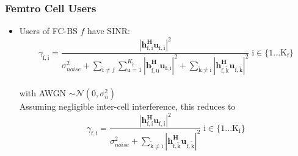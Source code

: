 \documentclass[12pt]{article}
\begin{document}
\subsubsection{Femtro Cell Users}
\begin{itemize}



\item Users of FC-BS $f$ have SINR:
\begin{equation}
\gamma_{\mathrm{f,i}} = \frac{|\mathbf{h^H_{\mathrm{f,i}}u_{\mathrm{f,i}}}|^2}
{\sigma^2_{noise}   + \sum_{\mathrm{\tilde{f}}\neq f} \sum_{\mathrm{u=1}}^{K_{\mathrm{\tilde{f}}}}
|\mathbf{h^H_{\mathrm{\tilde{f},u}}u_{\mathrm{f,i}}}|^2
 + \sum_{\mathrm{\tilde{k}\neq i}}
  |\mathbf{h^H_{\mathrm{f,\tilde{k}}}u_{\mathrm{f,\tilde{k}}}}|^2}
  \; \mathrm{i \in \{1 ... K_f\}}
\end{equation}
\\
with AWGN $\sim \mathcal{N}(0,\sigma^2_n)$
\\

Assuming negligible inter-cell interference, this reduces to
\begin{equation}
\gamma_{\mathrm{f,i}} = \frac{|\mathbf{h^H_{\mathrm{f,i}}u_{\mathrm{f,i}}}|^2}
{\sigma^2_{noise} 
 + \sum_{\mathrm{\tilde{k}\neq i}}
  |\mathbf{h^H_{\mathrm{f,\tilde{k}}}u_{\mathrm{f,\tilde{k}}}}|^2}
  \; \mathrm{i \in \{1 ... K_f\}}
\end{equation}
\\

%

\end{itemize}


%
%
\end{document}

